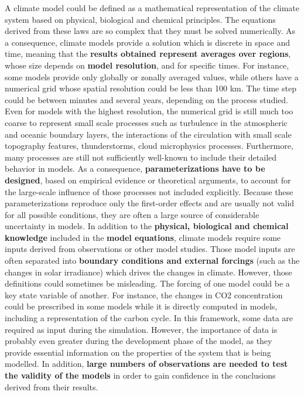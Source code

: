 \documentclass[12pt,oneside]{book}
\begin{document}
A climate model could be defined as a mathematical representation of the
climate system based on physical, biological and chemical principles.
The equations derived from these laws are so complex that they must be
solved numerically. As a consequence, climate models provide a solution
which is discrete in space and time, meaning that the \textbf{results
obtained represent averages over regions}, whose size depends on
\textbf{model resolution}, and for specific times. For instance, some
models provide only globally or zonally averaged values, while others
have a numerical grid whose spatial resolution could be less than 100
km. The time step could be between minutes and several years, depending
on the process studied. Even for models with the highest resolution, the
numerical grid is still much too coarse to represent small scale
processes such as turbulence in the atmospheric and oceanic boundary
layers, the interactions of the circulation with small scale topography
features, thunderstorms, cloud microphysics processes. Furthermore, many
processes are still not sufficiently well-known to include their
detailed behavior in models. As a consequence, \textbf{parameterizations
have to be designed}, based on empirical evidence or theoretical
arguments, to account for the large-scale influence of those processes
not included explicitly. Because these parameterizations reproduce only
the first-order effects and are usually not valid for all possible
conditions, they are often a large source of considerable uncertainty in
models. In addition to the \textbf{physical, biological and chemical
knowledge} included in the \textbf{model equations}, climate models
require some inputs derived from observations or other model studies.
Those model inputs are often separated into \textbf{boundary conditions
and external forcings} (such as the changes in solar irradiance) which
drives the changes in climate. However, those definitions could
sometimes be misleading. The forcing of one model could be a key state
variable of another. For instance, the changes in CO2 concentration
could be prescribed in some models while it is directly computed in
models, including a representation of the carbon cycle. In this
framework, some data are required as input during the simulation.
However, the importance of data is probably even greater during the
development phase of the model, as they provide essential information on
the properties of the system that is being modelled. In addition,
\textbf{large numbers of observations are needed to test the validity of
the models} in order to gain confidence in the conclusions derived from
their results.
\end{document}
